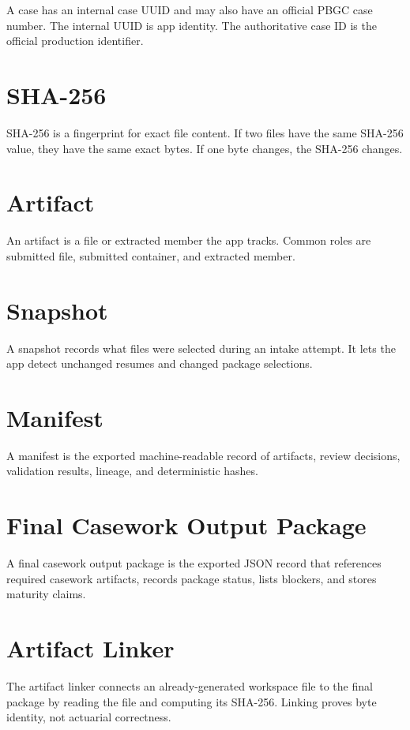 A case has an internal case UUID and may also have an official PBGC case number. The internal UUID is app identity. The authoritative case ID is the official production identifier.

\section{SHA-256}

SHA-256 is a fingerprint for exact file content. If two files have the same SHA-256 value, they have the same exact bytes. If one byte changes, the SHA-256 changes.

\section{Artifact}

An artifact is a file or extracted member the app tracks. Common roles are submitted file, submitted container, and extracted member.

\section{Snapshot}

A snapshot records what files were selected during an intake attempt. It lets the app detect unchanged resumes and changed package selections.

\section{Manifest}

A manifest is the exported machine-readable record of artifacts, review decisions, validation results, lineage, and deterministic hashes.

\section{Final Casework Output Package}

A final casework output package is the exported JSON record that references required casework artifacts, records package status, lists blockers, and stores maturity claims.

\section{Artifact Linker}

The artifact linker connects an already-generated workspace file to the final package by reading the file and computing its SHA-256. Linking proves byte identity, not actuarial correctness.

